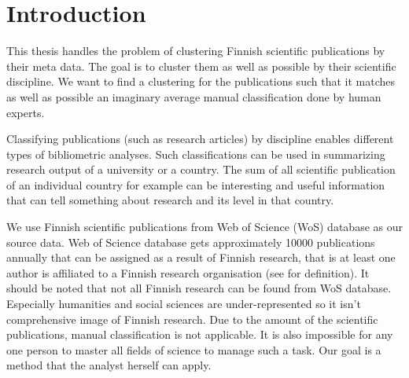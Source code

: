 \chapter{Introduction}
\label{chapter:intro}
This thesis handles the problem of clustering Finnish scientific 
publications by their meta data. The goal is to cluster 
them as well as possible by their scientific discipline. We want 
to find a clustering for the publications such that it matches 
as well as possible an imaginary average manual classification 
done by human experts.

Classifying publications (such as research articles) by discipline 
enables different types of bibliometric analyses. Such 
classifications can be used in summarizing research output of a 
university or a country. The sum of all scientific publication of 
an individual country for example can be interesting and useful 
information that can tell something about research and its level 
in that country.

We use Finnish scientific publications from  Web of Science (WoS)
database as our source data. 
Web of Science database gets approximately 10000 publications 
annually that can be assigned as a result of Finnish research, that
is at least one author is affiliated to a Finnish research 
organisation (see \cite{auranen_tieteen_2018} for definition).
It should be noted that not all Finnish research can be found from
WoS database. Especially humanities and social sciences are 
under-represented so it isn't comprehensive image of Finnish 
research.
Due to the amount of the scientific publications, manual 
classification is not applicable. It is also impossible for any 
one person to master all fields of science to manage such a
task. Our goal is a method that the analyst herself can apply.

